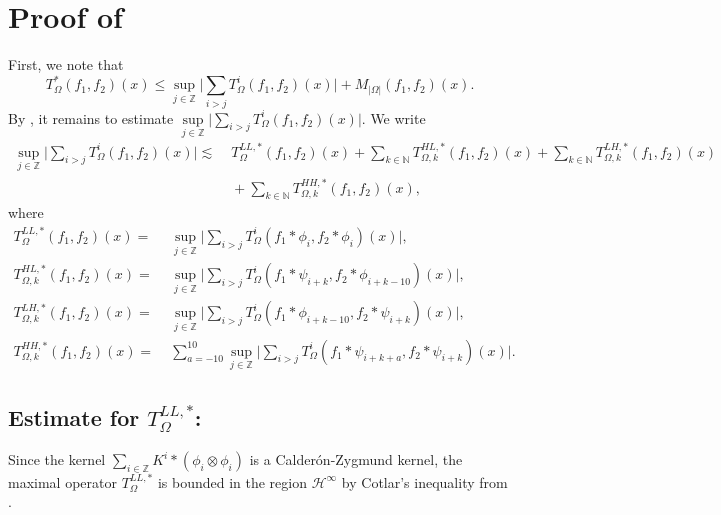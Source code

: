 \documentclass[a4paper,reqno]{amsart}
\newcommand{\N}{{\mathbb N}}
\newcommand{\Z}{{\mathbb Z}}
\theoremstyle{definition}
\numberwithin{equation}{section}
\begin{document}
\section{Proof of }\label{sec:proofmaximal}
First, we note that \[T_\Omega^*(f_1,f_2)(x)\leq\sup\limits_{j\in\Z}\Big|\sum\limits_{i>j}T_\Omega^i(f_1,f_2)(x)\Big|+M_{|\Omega|}(f_1,f_2)(x).\]
By , it remains to estimate $\sup\limits_{j\in\Z}\Big|\sum\limits_{i>j}T_\Omega^i(f_1,f_2)(x)\Big|$. We write
\begin{align*}
	\sup\limits_{j\in\Z}\Big|\sum\limits_{i>j}T_\Omega^i(f_1,f_2)(x)\Big|\lesssim&\;T_{\Omega}^{LL,*}(f_1,f_2)(x)+\sum_{k\in\N}T_{\Omega,k}^{HL,*}(f_1,f_2)(x)+\sum_{k\in\N}T_{\Omega,k}^{LH,*}(f_1,f_2)(x)\\
	&\;+\sum_{k\in\N}T_{\Omega,k}^{HH,*}(f_1,f_2)(x),
\end{align*}
where 
\begin{align*}
	T_{\Omega}^{LL,*}(f_1,f_2)(x)=&\;\sup\limits_{j\in\Z}\Big|\sum\limits_{i>j}T^i_\Omega(f_1*\phi_i,f_2*\phi_i)(x)\Big|,\\
	T_{\Omega,k}^{HL,*}(f_1,f_2)(x)=&\;\sup\limits_{j\in\Z}\Big|\sum\limits_{i>j}T^i_\Omega(f_1*\psi_{i+k},f_2*\phi_{i+k-10})(x)\Big|,\\
	T_{\Omega,k}^{LH,*}(f_1,f_2)(x)=&\;\sup\limits_{j\in\Z}\Big|\sum\limits_{i>j}T^i_\Omega(f_1*\phi_{i+k-10},f_2*\psi_{i+k})(x)\Big|,\\
	T_{\Omega,k}^{HH,*}(f_1,f_2)(x)=&\;\sum_{a=-10}^{10}\sup\limits_{j\in\Z}\Big|\sum\limits_{i>j}T^i_\Omega(f_1*\psi_{i+k+a},f_2*\psi_{i+k})(x)\Big|.
\end{align*}
\subsection*{Estimate for $T^{LL,*}_{\Omega}$:} Since the kernel $\sum_{i\in\Z}K^i*(\phi_i\otimes\phi_i)$ is a Calder\'on-Zygmund kernel, the maximal operator $T_{\Omega}^{LL,*}$ is bounded in the region $\mathcal{H}^\infty$ by Cotlar's inequality from \cite{GT2002}.
\end{document}
